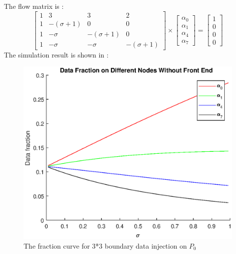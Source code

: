 The flow matrix is :
\begin{equation}
{
\left[ \begin{array}{cccc}
1 & 3 & 3 & 2\\
1 & -(\sigma + 1) & 0 & 0\\
1 & -\sigma & -(\sigma + 1) & 0\\
1 & -\sigma & -\sigma & -(\sigma + 1)
\end{array} 
\right ]} \times \left[ \begin{array}{c}
\alpha_{0} \\
\alpha_{1} \\
\alpha_{4} \\
\alpha_{7}
\end{array} 
\right ] = \left[ \begin{array}{c}
1 \\
0 \\
0 \\
0
\end{array} 
\right ]
\end{equation}
\newpage 
The simulation result is shown in :
\begin{figure}[!ht]
\centering
\includegraphics[width=1\columnwidth]{figure/3t3b_no_fraction.eps}
\caption{The fraction curve for 3*3 boundary data injection on $P_{0}$ }
\label{fig:3t3b_no_fraction}
\end{figure}

\newpage

